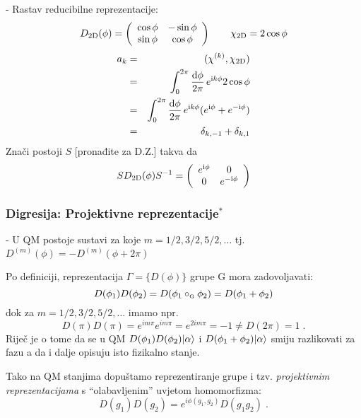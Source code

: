 - Rastav reducibilne reprezentacije:
\begin{displaymath}        
 D_{\rm 2D} (\phi) = \left( 
\begin{array}{cc}        
\cos\phi & -\sin\phi \\
\sin\phi & \cos\phi
\end{array}                
\right) \qquad \chi_{\rm 2D}=2\cos\phi
\end{displaymath}
\begin{eqnarray*}
a_k & = & (\chi^{(k)}, \chi_{\rm 2D}) \\
    & = & \int_{0}^{2\pi}\frac{\textrm{d} \phi}{2\pi}\,
   e^{\textrm{\scriptsize i} k \phi} 2\cos\phi  \\
 & = & \int_{0}^{2\pi}\frac{\textrm{d} \phi}{2\pi}\,
  e^{\textrm{\scriptsize i} k \phi} ( e^{\textrm{\scriptsize i}  \phi} + e^{-\textrm{\scriptsize i}  \phi}) \\
 & = & \delta_{k,-1} + \delta_{k, 1}
\end{eqnarray*}
Znači postoji $S$ [pronađite za D.Z.] takva da
\begin{displaymath}
  S D_{\rm 2D} (\phi) S^{-1} = \left(
\begin{array}{cc}        
e^{\textrm{\scriptsize i}  \phi} &  0 \\
0 & e^{- \textrm{\scriptsize i}  \phi}
\end{array}                
\right) 
\end{displaymath}

\subsubsection*{Digresija: Projektivne reprezentacije$^*$}

- U QM postoje sustavi za koje $m = 1/2, 3/2, 5/2, \ldots$ tj.
  $D^{(m)}(\phi)=-D^{(m)}(\phi + 2\pi)$


Po definiciji, reprezentacija $\Gamma=\{D(\phi)\}$ grupe G mora zadovoljavati:
\begin{displaymath}
    D(\phi_1)D(\phi_2)=D(\phi_1\circ_{\textrm{\tiny G}}\phi_2)
        =D(\phi_1 + \phi_2)
\end{displaymath}
dok za $m = 1/2, 3/2, 5/2, \ldots$ imamo npr.
\begin{displaymath}
 D(\pi) D(\pi) = e^{i m \pi}e^{i m \pi} = e^{2 i m \pi}=-1
\neq D(2\pi)=1 \;.
\end{displaymath}
Riječ je o tome da se u QM $D(\phi_1)D(\phi_2)| \alpha \rangle$ i
$D(\phi_1 + \phi_2)| \alpha \rangle$ smiju razlikovati za fazu
a da i dalje opisuju isto fizikalno stanje.

Tako na QM stanjima dopuštamo reprezentiranje grupe i tzv.
\emph{projektivnim reprezentacijama} s ``olabavljenim'' uvjetom homomorfizma:
\begin{displaymath}
   D(g_1)D(g_2)=e^{i \phi(g_1,g_2)}D(g_1 g_2) \;.
\end{displaymath}

